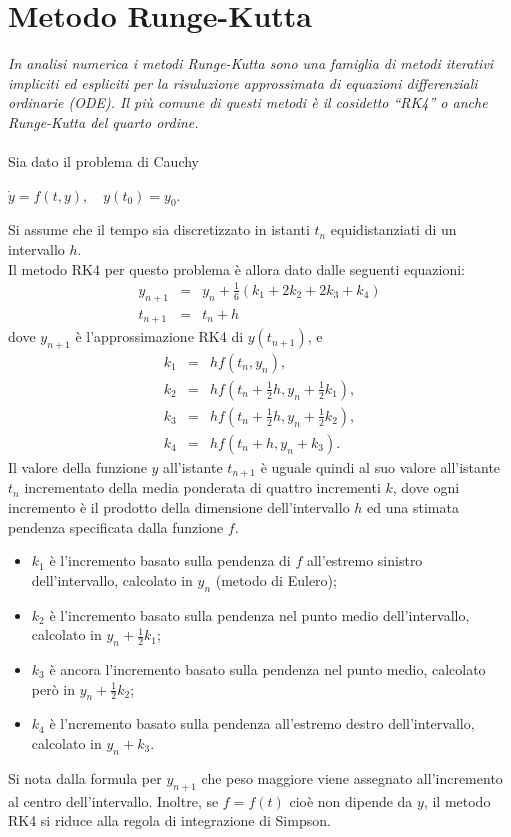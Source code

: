 \chapter{\huge Metodo Runge-Kutta}

\textit{In analisi numerica i metodi Runge-Kutta sono una famiglia di metodi iterativi impliciti ed espliciti per la risuluzione approssimata di equazioni differenziali ordinarie (ODE). Il più comune di questi metodi è il cosidetto ``RK4'' o anche Runge-Kutta del quarto ordine.}
\\\\
Sia dato il problema di Cauchy
\begin{center}
$ \dot y = f(t, y), \quad y(t_0) = y_0.$
\end{center}
Si assume che il tempo sia discretizzato in istanti $t_n$ equidistanziati di un intervallo $h$.\\
Il metodo RK4 per questo problema è allora dato dalle seguenti equazioni:
\begin{eqnarray*}
y_{n+1} &=& y_n + \tfrac{1}{6} \left(k_1 + 2k_2 + 2k_3 + k_4 \right)\\
t_{n+1} &=& t_n + h
\end{eqnarray*}
dove $y_{n+1}$ è l'approssimazione RK4 di $y(t_{n+1})$, e
\begin{eqnarray*}
k_1 &=& hf(t_n, y_n),\\
k_2 &=& hf(t_n + \tfrac{1}{2}h , y_n + \tfrac{1}{2} k_1),\\
k_3 &=& hf(t_n + \tfrac{1}{2}h , y_n + \tfrac{1}{2} k_2),\\
k_4 &=& hf(t_n + h , y_n + k_3).
\end{eqnarray*}
Il valore della funzione $y$ all'istante $t_{n+1}$ è uguale quindi al suo valore all'istante $t_n$ incrementato della media ponderata di quattro incrementi $k$, dove ogni incremento è il prodotto della dimensione dell'intervallo $h$ ed una stimata pendenza specificata dalla funzione $f$.
\begin{itemize}
\item $k_1$ è l'incremento basato sulla pendenza di $f$ all'estremo sinistro dell'intervallo, calcolato in $y_n$ (metodo di Eulero);
\item $k_2$ è l'incremento basato sulla pendenza nel punto medio dell'intervallo, calcolato in $y_n+\frac{1}{2}k_1$;
\item $k_3$ è ancora l'incremento basato sulla pendenza nel punto medio, calcolato però in $y_n+\frac{1}{2}k_2$;
\item $k_4$ è l'ncremento basato sulla pendenza all'estremo destro dell'intervallo, calcolato in $y_n+k_3$.
\end{itemize}
Si nota dalla formula per $y_{n+1}$ che peso maggiore viene assegnato all'incremento al centro dell'intervallo. Inoltre, se $f=f(t)$ cioè non dipende da $y$, il metodo RK4 si riduce alla regola di integrazione di Simpson.

